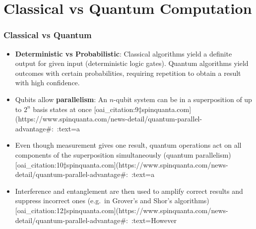 \documentclass{beamer}
\begin{document}
\section{Classical vs Quantum Computation}
\begin{frame}
\frametitle{Classical vs Quantum}
\begin{itemize}
  \item {\bf Deterministic vs Probabilistic}: Classical algorithms yield a definite output for given input (deterministic logic gates). Quantum algorithms yield outcomes with certain probabilities, requiring repetition to obtain a result with high confidence.
  \item Qubits allow {\bf parallelism}: An $n$-qubit system can be in a superposition of up to $2^n$ basis states at once [oai_citation:9‡spinquanta.com](https://www.spinquanta.com/news-detail/quantum-parallel-advantage#:~:text=a%
  \item Even though measurement gives one result, quantum operations act on all components of the superposition simultaneously (quantum parallelism) [oai_citation:10‡spinquanta.com](https://www.spinquanta.com/news-detail/quantum-parallel-advantage#:~:text=a%
  \item Interference and entanglement are then used to amplify correct results and suppress incorrect ones (e.g.\ in Grover's and Shor's algorithms) [oai_citation:12‡spinquanta.com](https://www.spinquanta.com/news-detail/quantum-parallel-advantage#:~:text=However%
\end{itemize}
\end{frame}
\end{document}
